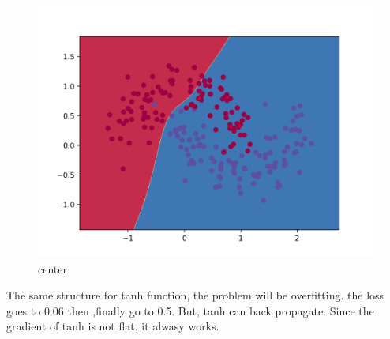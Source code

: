 \documentclass[12pt]{article}
\begin{document}
\begin{figure}[H]
  \caption{center}
  \centering
    \includegraphics[scale=0.2]{tandeep.png}
\end{figure}
The same structure for tanh function, the problem will be overfitting. the loss goes to 0.06 then ,finally go to 0.5. But, tanh can back propagate. Since the gradient of tanh is not flat, it alwasy works.  
\end{document}
